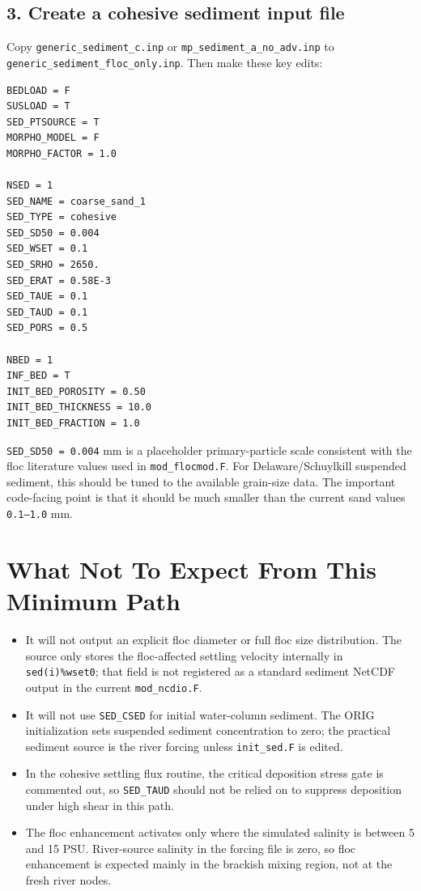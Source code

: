 \documentclass[11pt]{article}
\begin{document}
\subsection*{3. Create a cohesive sediment input file}

Copy \texttt{generic\_sediment\_c.inp} or
\texttt{mp\_sediment\_a\_no\_adv.inp} to
\texttt{generic\_sediment\_floc\_only.inp}.  Then make these key edits:

\begin{verbatim}
BEDLOAD = F
SUSLOAD = T
SED_PTSOURCE = T
MORPHO_MODEL = F
MORPHO_FACTOR = 1.0

NSED = 1
SED_NAME = coarse_sand_1
SED_TYPE = cohesive
SED_SD50 = 0.004
SED_WSET = 0.1
SED_SRHO = 2650.
SED_ERAT = 0.58E-3
SED_TAUE = 0.1
SED_TAUD = 0.1
SED_PORS = 0.5

NBED = 1
INF_BED = T
INIT_BED_POROSITY = 0.50
INIT_BED_THICKNESS = 10.0
INIT_BED_FRACTION = 1.0
\end{verbatim}

\texttt{SED\_SD50 = 0.004} mm is a placeholder primary-particle scale
consistent with the floc literature values used in \texttt{mod\_flocmod.F}.
For Delaware/Schuylkill suspended sediment, this should be tuned to the
available grain-size data.  The important code-facing point is that it should
be much smaller than the current sand values \texttt{0.1--1.0} mm.

\section*{What Not To Expect From This Minimum Path}

\begin{itemize}
  \item It will not output an explicit floc diameter or full floc size
        distribution.  The source only stores the floc-affected settling
        velocity internally in \texttt{sed(i)\%wset0}; that field is not
        registered as a standard sediment NetCDF output in the current
        \texttt{mod\_ncdio.F}.
  \item It will not use \texttt{SED\_CSED} for initial water-column sediment.
        The ORIG initialization sets suspended sediment concentration to zero;
        the practical sediment source is the river forcing unless
        \texttt{init\_sed.F} is edited.
  \item In the cohesive settling flux routine, the critical deposition stress
        gate is commented out, so \texttt{SED\_TAUD} should not be relied on to
        suppress deposition under high shear in this path.
  \item The floc enhancement activates only where the simulated salinity is
        between 5 and 15 PSU.  River-source salinity in the forcing file is
        zero, so floc enhancement is expected mainly in the brackish mixing
        region, not at the fresh river nodes.
\end{itemize}
\end{document}
